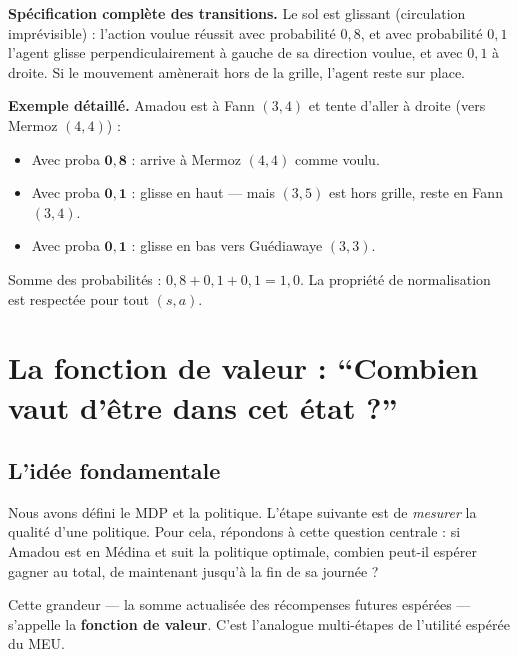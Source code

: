 \documentclass[11pt,a4paper]{article}
\begin{document}
\textbf{Spécification complète des transitions.} Le sol est glissant (circulation imprévisible) : l'action voulue réussit avec probabilité $0{,}8$, et avec probabilité $0{,}1$ l'agent glisse perpendiculairement à gauche de sa direction voulue, et avec $0{,}1$ à droite. Si le mouvement amènerait hors de la grille, l'agent reste sur place.

\textbf{Exemple détaillé.} Amadou est à Fann $(3,4)$ et tente d'aller à droite (vers Mermoz $(4,4)$) :
\begin{itemize}[nosep]
    \item Avec proba $\mathbf{0{,}8}$ : arrive à Mermoz $(4,4)$ comme voulu.
    \item Avec proba $\mathbf{0{,}1}$ : glisse en haut --- mais $(3,5)$ est hors grille, reste en Fann $(3,4)$.
    \item Avec proba $\mathbf{0{,}1}$ : glisse en bas vers Guédiawaye $(3,3)$.
\end{itemize}

Somme des probabilités : $0{,}8 + 0{,}1 + 0{,}1 = 1{,}0$. La propriété de normalisation est respectée pour tout $(s, a)$.

\section{La fonction de valeur : ``Combien vaut d'être dans cet état ?''}

\subsection{L'idée fondamentale}

Nous avons défini le MDP et la politique. L'étape suivante est de \textit{mesurer} la qualité d'une politique. Pour cela, répondons à cette question centrale : si Amadou est en Médina et suit la politique optimale, combien peut-il espérer gagner au total, de maintenant jusqu'à la fin de sa journée ?

Cette grandeur --- la somme actualisée des récompenses futures espérées --- s'appelle la \textbf{fonction de valeur}. C'est l'analogue multi-étapes de l'utilité espérée du MEU.
\end{document}
